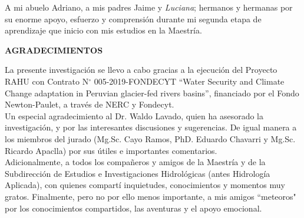 \begin{flushright}
A mi abuelo Adriano, a mis padres Jaime y \textit{Luciana}; hermanos y hermanas por su enorme apoyo, esfuerzo y comprensión durante mi segunda etapa de aprendizaje que inicio con mis estudios en la Maestría.
\end{flushright}

\clearpage
\begin{center}
\large{\textbf {AGRADECIMIENTOS}}
\end{center}

\begin{flushright}

La presente investigación se llevo a cabo gracias a la ejecución del Proyecto RAHU con Contrato N$^{\circ}$ 005-2019-FONDECYT “Water Security and Climate Change adaptation in Peruvian glacier-fed rivers basins”, financiado por el Fondo Newton-Paulet, a través de NERC y Fondecyt.\\
Un especial agradecimiento al Dr. Waldo Lavado, quien ha asesorado la investigación, y por las interesantes discusiones y sugerencias. De igual manera a los miembros del jurado (Mg.Sc. Cayo Ramos, PhD. Eduardo Chavarri y Mg.Sc. Ricardo Apaclla) por sus útiles e importantes comentarios.\\
Adicionalmente, a todos los compañeros y amigos de la Maestría y de la Subdirección de Estudios e Investigaciones Hidrológicas (antes Hidrología Aplicada), con quienes compartí inquietudes, conocimientos y momentos muy gratos. Finalmente, pero no por ello menos importante, a mis amigos “meteoros" por los conocimientos compartidos, las aventuras y el apoyo emocional.
\end{flushright}

